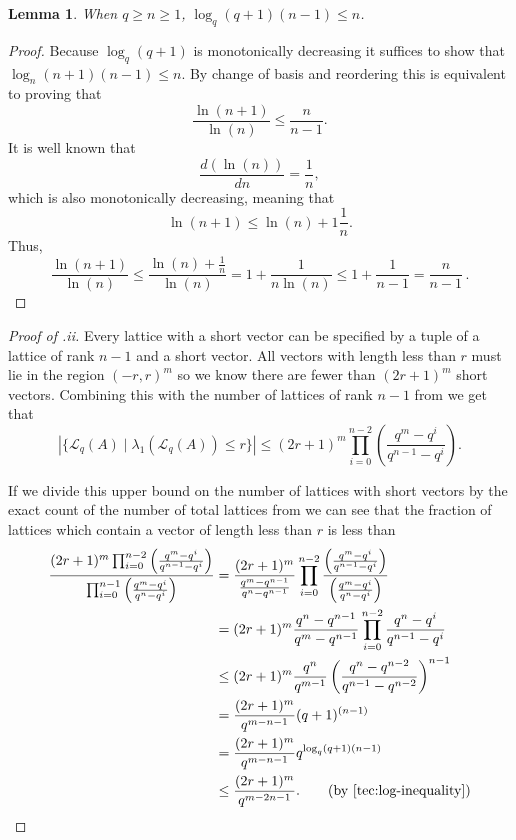 \documentclass[11pt]{article}
\theoremstyle{definition}
\theoremstyle{plain}
\newtheorem{lemma}[definition]{Lemma}
\theoremstyle{remark}
\newcommand{\LL}{\mathcal{L}}
\begin{document}
\begin{lemma}\label{tec:log-inequality} 
When $q \geq n \geq 1$, $\log_q(q+1)(n-1) \leq n$.
\end{lemma}
\begin{proof}
    Because $\log_q(q+1)$ is monotonically decreasing it suffices to show that $\log_n(n+1)(n-1) \leq n$. By change of basis and reordering this is equivalent to proving that
    \[ \frac{\ln(n+1)}{\ln(n)} \leq \frac{n}{n-1}. \]
    It is well known that \[ \frac{d(\ln(n))}{dn} = \frac{1}{n}, \] which is also monotonically decreasing, meaning that \[ \ln(n+1) \leq \ln(n) + 1\frac{1}{n}. \]
    Thus,
    \[ \frac{\ln(n+1)}{\ln(n)} \leq \frac{\ln(n) + \frac{1}{n}}{\ln(n)} = 1 + \frac{1}{n\ln(n)} \leq 1 + \frac{1}{n-1} = \frac{n}{n-1}\,. \]
\end{proof}

\begin{proof}[Proof of .ii]
    Every lattice with a short vector can be specified by a tuple of a lattice of rank $n-1$ and a short vector. All vectors with length less than $r$ must lie in the region $(-r,r)^m$ so we know there are fewer than $(2r+1)^m$ short vectors. Combining this with the number of lattices of rank $n-1$ from  we get that 
    \[ |\{\LL_q(A) \mid \lambda_1(\LL_q(A)) \leq r\}| \leq(2r+1)^m \prod_{i=0}^{n-2}\left(\frac{q^m - q^i}{q^{n-1} - q^i}\right). \]
    
    If we divide this upper bound on the number of lattices with short vectors by the exact count of the number of total lattices from   we can see that the fraction of lattices which contain a vector of length less than $r$ is less than
    \begin{align*}
    \frac{(2r+1)^m \prod_{i=0}^{n-2}\left(\frac{q^m - q^i}{q^{n-1} - q^i}\right)}{\prod_{i=0}^{n-1}\left(\frac{q^m - q^i}{q^n - q^i}\right)} &= \frac{(2r+1)^m}{\frac{q^m-q^{n-1}}{q^n-q^{n-1}}} \prod_{i=0}^{n-2} \frac{\left(\frac{q^m - q^i}{q^{n-1} - q^i}\right)}{\left(\frac{q^m - q^i}{q^n - q^i}\right)} \\
    & = (2r+1)^m \frac{q^n - q^{n-1}}{q^m - q^{n-1}}\prod_{i=0}^{n-2}\frac{q^n-q^i}{q^{n-1}-q^i}\\
    & \leq (2r+1)^m \frac{q^n}{q^{m-1}}\left(\frac{q^n-q^{n-2}}{q^{n-1}-q^{n-2}}\right)^{n-1} \\
    &= \frac{(2r+1)^m}{q^{m-n-1}}(q+1)^{(n-1)} \\
    &= \frac{(2r+1)^m}{q^{m-n-1}}q^{\log_{q}(q+1)(n-1)}\\
&\leq \frac{(2r+1)^m}{q^{m-2n -1}}. \tag{by \Cref{tec:log-inequality}}
    \end{align*}
\end{proof}
\end{document}
